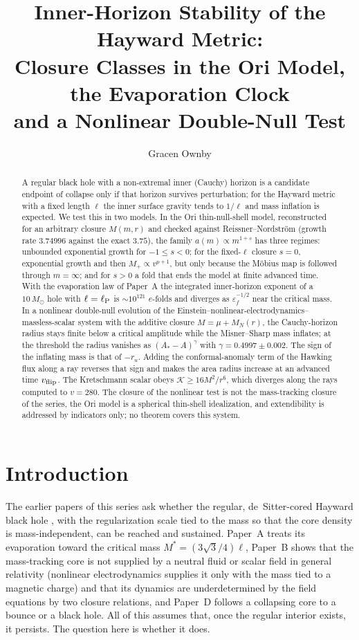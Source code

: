 \documentclass[11pt]{article}
\title{Inner-Horizon Stability of the Hayward Metric:\\
Closure Classes in the Ori Model, the Evaporation Clock\\
and a Nonlinear Double-Null Test}
\author{Gracen Ownby}
\date{}
\begin{document}
\maketitle

\begin{abstract}
A regular black hole with a non-extremal inner (Cauchy) horizon is a candidate endpoint of collapse only if that horizon survives perturbation; for the Hayward metric with a fixed length $\ell$ the inner surface gravity tends to $1/\ell$ and mass inflation is expected. We test this in two models. In the Ori thin-null-shell model, reconstructed for an arbitrary closure $M(m,r)$ and checked against Reissner--Nordstr\"om (growth rate $3.74996$ against the exact $3.75$), the family $a(m)\propto m^{1+s}$ has three regimes: unbounded exponential growth for $-1\le s<0$; for the fixed-$\ell$ closure $s=0$, exponential growth and then $M_+\propto v^{p+1}$, but only because the M\"obius map is followed through $m=\infty$; and for $s>0$ a fold that ends the model at finite advanced time. With the evaporation law of Paper~A the integrated inner-horizon exponent of a $10\,M_\odot$ hole with $\ell=\ell_{\rm P}$ is $\sim10^{121}$ $e$-folds and diverges as $\varepsilon_f^{-1/2}$ near the critical mass. In a nonlinear double-null evolution of the Einstein--nonlinear-electrodynamics--massless-scalar system with the additive closure $M=\mu+M_N(r)$, the Cauchy-horizon radius stays finite below a critical amplitude while the Misner--Sharp mass inflates; at the threshold the radius vanishes as $(A_*-A)^{\gamma}$ with $\gamma=0.4997\pm0.002$. The sign of the inflating mass is that of $-r_u$. Adding the conformal-anomaly term of the Hawking flux along a ray reverses that sign and makes the area radius increase at an advanced time $v_{\rm flip}$. The Kretschmann scalar obeys $\mathcal K\ge16M^2/r^6$, which diverges along the rays computed to $v=280$. The closure of the nonlinear test is not the mass-tracking closure of the series, the Ori model is a spherical thin-shell idealization, and extendibility is addressed by indicators only; no theorem covers this system.
\end{abstract}

\section{Introduction}
\label{sec:intro}

The earlier papers of this series ask whether the regular, de~Sitter-cored Hayward black hole \citep{Hayward2006}, with the regularization scale tied to the mass so that the core density is mass-independent, can be reached and sustained. Paper~A \citep{PaperA} treats its evaporation toward the critical mass $M^*=(3\sqrt3/4)\ell$, Paper~B \citep{PaperB} shows that the mass-tracking core is not supplied by a neutral fluid or scalar field in general relativity (nonlinear electrodynamics supplies it only with the mass tied to a magnetic charge) and that its dynamics are underdetermined by the field equations by two closure relations, and Paper~D \citep{PaperD} follows a collapsing core to a bounce or a black hole. All of this assumes that, once the regular interior exists, it persists. The question here is whether it does.
\end{document}

